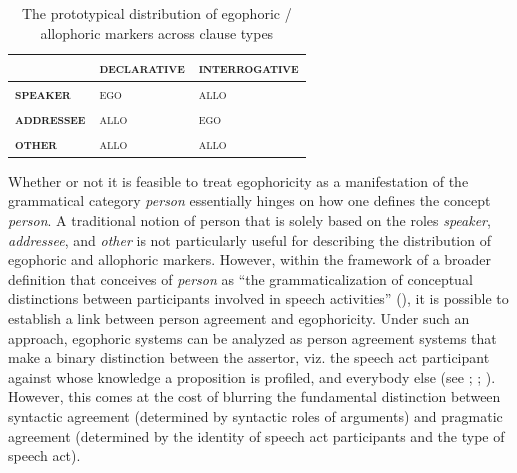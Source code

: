 \documentclass[output=paper]{langsci/langscibook}
\begin{document}
\begin{table}
\begin{tabularx}{.80\textwidth}{XXX}
\hline
	&	\textbf{\textsc{declarative}}	& \textbf{\textsc{interrogative}}	\\
\hline
\textbf{\textsc{speaker}}	&	\textsc{ego}	&	\textsc{allo}	\\
\textbf{\textsc{addressee}}	&	\textsc{allo}	&	\textsc{ego}	\\
\textbf{\textsc{other}}	&	\textsc{allo}	&	\textsc{allo}	\\
\hline
\end{tabularx}
\caption{The prototypical distribution of egophoric / allophoric markers across clause types}
\label{tab:mw2}
\end{table}	

Whether or not it is feasible to treat egophoricity as a manifestation of the grammatical category \emph{person} essentially hinges on how one defines the concept \emph{person}. A traditional notion of person that is solely based on the roles \emph{speaker}, \emph{addressee}, and \emph{other} is not particularly useful for describing the distribution of egophoric and allophoric markers. However, within the framework of a broader definition that conceives of \emph{person} as “the grammaticalization of conceptual distinctions between participants involved in speech activities” (\citealt[220]{BickelNichols2007}), it is possible to establish a link between person agreement and egophoricity. Under such an approach, egophoric systems can be analyzed as person agreement systems that make a binary distinction between the assertor, viz. the speech act participant against whose knowledge a proposition is profiled, and everybody else (see \citealt{Bickel2008}; \citealt[223]{BickelNichols2007}; \citealt{Creissels2008}). However, this comes at the cost of blurring the fundamental distinction between syntactic agreement (determined by syntactic roles of arguments) and pragmatic agreement (determined by the identity of speech act participants and the type of speech act).
\end{document}

